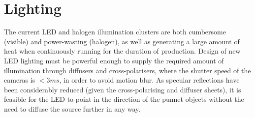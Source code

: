 \documentclass[fleqn,twoside,12pt]{report}
\begin{document}
\section{Lighting}

The current LED and halogen illumination clusters are both cumbersome (visible) and power-wasting (halogen), as well as generating a large amount of heat when continuously running for the duration of production. Design of new LED lighting must be powerful enough to supply the required amount of illumination through diffusers and cross-polarisers, where the shutter speed of the cameras is $<3ms$, in order to avoid motion blur. As specular reflections have been considerably reduced (given the cross-polarising and diffuser sheets), it is feasible for the LED to point in the direction of the punnet objects without the need to diffuse the source further in any way.
\end{document}
